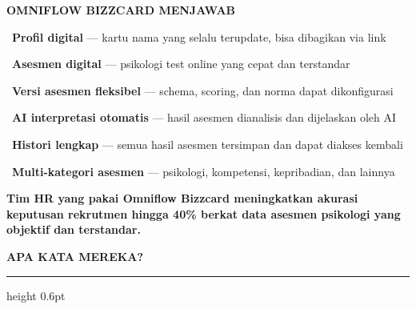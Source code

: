 \documentclass[a4paper]{article}
\newcommand{\sectiontitle}[1]{%
    \vspace{10pt}%
    {\fontsize{13}{16}\selectfont\bfseries\color{BlueDark} #1}\par\vspace{3pt}%
    {\color{BluePrimary}\hrule height 0.6pt}\par\vspace{8pt}%
}
\begin{document}
\begin{minipage}[t]{0.485\textwidth}
    \colorbox{FuchsiaPrimary}{%
        \begin{minipage}{\dimexpr\textwidth-2\fboxsep\relax}
            {\fontsize{10}{13}\selectfont\bfseries\color{White} OMNIFLOW BIZZCARD MENJAWAB}
        \end{minipage}}\par
    \vspace{4pt}

    {\fontsize{9.5}{13}\selectfont\color{TextDark}%
    \textbullet\ \textbf{Profil digital} --- kartu nama yang selalu terupdate, bisa dibagikan via link\par\vspace{4pt}%
    \textbullet\ \textbf{Asesmen digital} --- psikologi test online yang cepat dan terstandar\par\vspace{4pt}%
    \textbullet\ \textbf{Versi asesmen fleksibel} --- schema, scoring, dan norma dapat dikonfigurasi\par\vspace{4pt}%
    \textbullet\ \textbf{AI interpretasi otomatis} --- hasil asesmen dianalisis dan dijelaskan oleh AI\par\vspace{4pt}%
    \textbullet\ \textbf{Histori lengkap} --- semua hasil asesmen tersimpan dan dapat diakses kembali\par\vspace{4pt}%
    \textbullet\ \textbf{Multi-kategori asesmen} --- psikologi, kompetensi, kepribadian, dan lainnya}%
\end{minipage}

\vspace{8pt}

{\setlength{\fboxsep}{7pt}\setlength{\fboxrule}{0pt}%
\noindent\colorbox{FuchsiaPrimary}{%
    \begin{minipage}{\dimexpr\textwidth-2\fboxsep\relax}
        \centering
        {\fontsize{9.5}{12}\selectfont\bfseries\color{White}
        Tim HR yang pakai Omniflow Bizzcard meningkatkan \textbf{akurasi keputusan rekrutmen hingga 40\%} berkat data asesmen psikologi yang objektif dan terstandar.}
    \end{minipage}}}

\vspace{8pt}
\sectiontitle{APA KATA MEREKA?}
\end{document}
